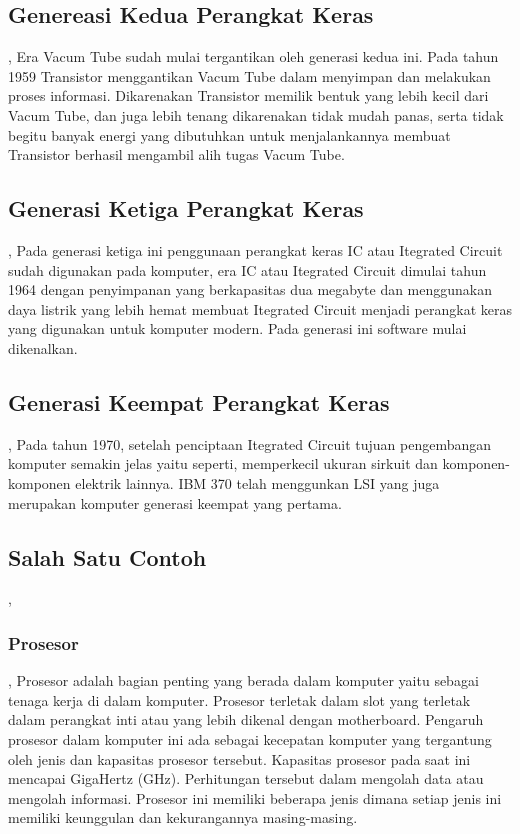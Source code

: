 \subsection{Genereasi Kedua Perangkat Keras},
Era Vacum Tube sudah mulai tergantikan oleh generasi kedua ini. Pada tahun 1959 Transistor menggantikan Vacum Tube dalam
menyimpan dan melakukan proses informasi. Dikarenakan Transistor memilik bentuk yang lebih kecil dari Vacum Tube, dan juga lebih tenang
dikarenakan tidak mudah panas, serta tidak begitu banyak energi yang dibutuhkan untuk menjalankannya membuat Transistor berhasil mengambil
alih tugas Vacum Tube.

\subsection{Generasi Ketiga Perangkat Keras},
Pada generasi ketiga ini penggunaan perangkat keras IC atau Itegrated Circuit sudah digunakan pada komputer, era IC atau Itegrated Circuit
dimulai tahun 1964 dengan penyimpanan yang berkapasitas dua megabyte dan menggunakan daya listrik yang lebih hemat membuat Itegrated Circuit
menjadi perangkat keras yang digunakan untuk komputer modern. Pada generasi ini software mulai dikenalkan.

\subsection{Generasi Keempat Perangkat Keras},
Pada tahun 1970, setelah penciptaan Itegrated Circuit tujuan pengembangan komputer semakin jelas yaitu seperti, memperkecil ukuran
sirkuit dan komponen-komponen elektrik lainnya. IBM 370 telah menggunkan LSI yang juga merupakan komputer generasi keempat yang pertama.

\subsection{Salah Satu Contoh},

\subsubsection{Prosesor},
Prosesor adalah bagian penting yang berada dalam komputer yaitu sebagai tenaga kerja di dalam komputer. Prosesor terletak dalam slot
yang terletak dalam perangkat inti atau yang lebih dikenal dengan motherboard. Pengaruh prosesor dalam komputer ini ada sebagai kecepatan
komputer yang tergantung oleh jenis dan kapasitas prosesor tersebut. Kapasitas prosesor pada saat ini mencapai GigaHertz (GHz).
Perhitungan tersebut dalam mengolah data atau mengolah informasi. Prosesor ini memiliki beberapa jenis dimana setiap jenis ini memiliki 
keunggulan dan kekurangannya masing-masing.

